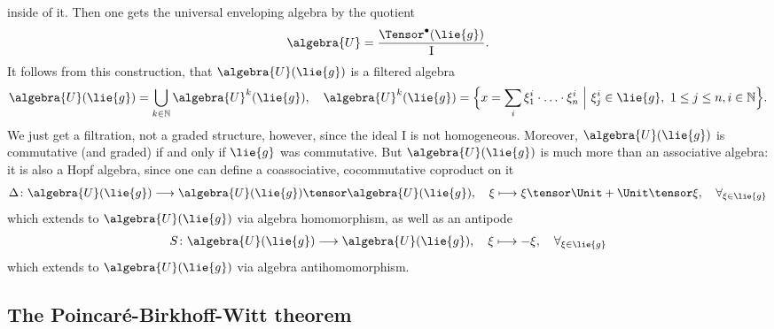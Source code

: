 inside of it. Then one gets the universal enveloping algebra by the quotient
\begin{equation}
	\label{Alg:UnivEnvAlg}
	\algebra{U}
	=
	\frac{\Tensor^{\bullet}(\lie{g})}{\mathrm{I}}.
\end{equation}
It follows from this construction, that $\algebra{U}(\lie{g})$ is a filtered 
algebra
\begin{equation*}
	\algebra{U}(\lie{g})
	=
	\bigcup_{k \in \mathbb{N}}
	\algebra{U}^k(\lie{g})
	, \quad
	\algebra{U}^k(\lie{g})
	= 
	\Big\lbrace
		x 
		= 
		\sum_i
		\xi_1^i \cdot \ldots \cdot \xi_n^i
	\ \Big| \ 
		\xi_j^i \in \lie{g}
		, \
		1 \leq j \leq n,
		i \in \mathbb{N}
	\Big\rbrace.
\end{equation*}
We just get a filtration, not a graded structure, however, since the ideal 
$\mathrm{I}$ is not homogeneous. Moreover, $\algebra{U}(\lie{g})$ is 
commutative (and graded) if and only if $\lie{g}$ was commutative. But 
$\algebra{U}(\lie{g})$ is much more than an associative algebra: it is also a 
Hopf algebra, since one can define a coassociative, cocommutative coproduct on 
it
\begin{equation*}
	\Delta \colon
	\algebra{U}(\lie{g})
	\longrightarrow
	\algebra{U}(\lie{g})
	\tensor
	\algebra{U}(\lie{g})
	, \quad
	\xi
	\longmapsto
	\xi \tensor \Unit
	+
	\Unit \tensor \xi
	, \quad
	\forall_{\xi \in \lie{g}}
\end{equation*} 
which extends to $\algebra{U}(\lie{g})$ via algebra homomorphism, as well as an antipode
\begin{equation*}
	S \colon
	\algebra{U}(\lie{g})
	\longrightarrow
	\algebra{U}(\lie{g})
	, \quad
	\xi
	\longmapsto
	- \xi
	, \quad
	\forall_{\xi \in \lie{g}}
\end{equation*}
which extends to $\algebra{U}(\lie{g})$ via algebra antihomomorphism.

\subsection{The Poincar\'e-Birkhoff-Witt theorem}
\label{subsec:chap3_PoincareBirkhoffWitt}

